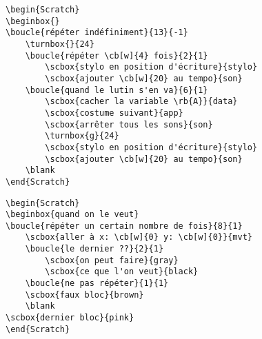 \documentclass[a4paper,11pt]{article}
\begin{document}
\begin{center}
\begin{Scratch}[1]%
\beginbox{}


		

			
		

\end{Scratch}\end{center}

\newpage
\begin{verbatim}
\begin{Scratch}
\beginbox{}
\boucle{répéter indéfiniment}{13}{-1}
	\turnbox{}{24}
	\boucle{répéter \cb[w]{4} fois}{2}{1}
		\scbox{stylo en position d'écriture}{stylo}
		\scbox{ajouter \cb[w]{20} au tempo}{son}
	\boucle{quand le lutin s'en va}{6}{1}
		\scbox{cacher la variable \rb{A}}{data}
		\scbox{costume suivant}{app}
		\scbox{arrêter tous les sons}{son}
		\turnbox{g}{24}
		\scbox{stylo en position d'écriture}{stylo}
		\scbox{ajouter \cb[w]{20} au tempo}{son}
	\blank
\end{Scratch}
\end{verbatim}
\begin{center}
\begin{Scratch}[1]%
\beginbox{}
	\blank
\end{Scratch}
\end{center}
\newpage
\begin{verbatim}
\begin{Scratch}
\beginbox{quand on le veut}
\boucle{répéter un certain nombre de fois}{8}{1}
	\scbox{aller à x: \cb[w]{0} y: \cb[w]{0}}{mvt}
	\boucle{le dernier ??}{2}{1}
		\scbox{on peut faire}{gray}
		\scbox{ce que l'on veut}{black}
	\boucle{ne pas répéter}{1}{1}
	\scbox{faux bloc}{brown}
	\blank
\scbox{dernier bloc}{pink}
\end{Scratch}
\end{verbatim}
\end{document}

